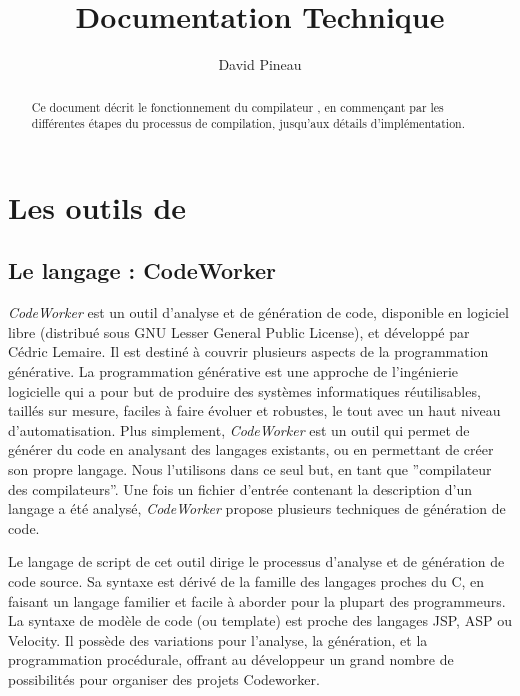 \documentclass[french]{rtxreport}
\author{David Pineau}
\title{Documentation Technique}
\begin{document}
\maketitle

\rtxmaketitleblock

\tableofcontents

\begin{abstract}
    Ce document décrit le fonctionnement du compilateur \rtx, en commençant par
    les différentes étapes du processus de compilation, jusqu'aux détails
    d'implémentation.  \end{abstract}





\chapter{Les outils de \rtx}

\section{Le langage : CodeWorker}

\emph{CodeWorker} est un outil d'analyse et de génération de code, disponible
en logiciel libre (distribué sous GNU Lesser General Public License), et
développé par Cédric Lemaire. Il est destiné à couvrir plusieurs aspects de la
programmation générative. La programmation générative est une approche de
l'ingénierie logicielle qui a pour but de produire des systèmes informatiques
réutilisables, taillés sur mesure, faciles à faire évoluer et robustes, le tout
avec un haut niveau d'automatisation. Plus simplement, \emph{CodeWorker} est un
outil qui permet de générer du code en analysant des langages existants, ou en
permettant de créer son propre langage. Nous l'utilisons dans ce seul but, en
tant que ''compilateur des compilateurs''. Une fois un fichier d'entrée
contenant la description d'un langage a été analysé, \emph{CodeWorker} propose
plusieurs techniques de génération de code.

Le langage de script de cet outil dirige le processus d'analyse et de génération
de code source. Sa syntaxe est dérivé de la famille des langages proches du C,
en faisant un langage familier et facile à aborder pour la plupart des
programmeurs. La syntaxe de modèle de code (ou template) est proche des langages
JSP, ASP ou Velocity. Il possède des variations pour l'analyse, la génération,
et la programmation procédurale, offrant au développeur un grand nombre de
possibilités pour organiser des projets Codeworker.
\end{document}
